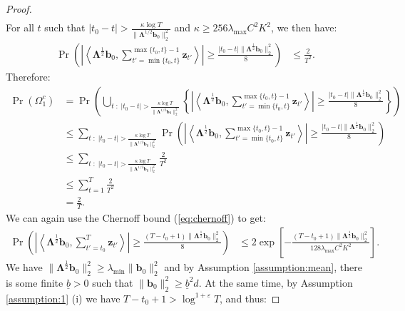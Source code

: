 \begin{proof}
\begin{align*}
\end{align*}
For all $t$ such that $|t_0 - t| > \frac{\kappa \log T}{\lVert \boldsymbol{\Lambda}^{1/2}\mathbf{b}_0\rVert_2^2}$ and $\kappa \geq 256\lambda_{\max}C^2K^2$, we then have: 
\begin{align*}
    \Pr\left(\left|\left\langle\boldsymbol{\Lambda}^{\frac{1}{2}}\mathbf{b}_0, \sum_{t'=\min\{t_0,t\}}^{\max\{t_0,t\}-1}\mathbf{z}_{t'} \right\rangle\right| \geq \frac{|t_0-t| \lVert\boldsymbol{\Lambda}^{\frac{1}{2}} \mathbf{b}_0\rVert_2^2}{8}\right) &\leq \frac{2}{T^2}.
\end{align*}
Therefore:
\begin{align*}
    \Pr(\Omega^c_1) &= \Pr\left(\bigcup_{t \;:\; |t_0 - t| > \frac{\kappa \log T}{\lVert \boldsymbol{\Lambda}^{1/2}\mathbf{b}_0\rVert_2^2}} \left\{\left|\left\langle\boldsymbol{\Lambda}^{\frac{1}{2}}\mathbf{b}_0, \sum_{t'=\min\{t_0,t\}}^{\max\{t_0,t\}-1}\mathbf{z}_{t'} \right\rangle\right| \geq \frac{|t_0-t| \lVert\boldsymbol{\Lambda}^{\frac{1}{2}} \mathbf{b}_0\rVert_2^2}{8}\right\} \right) \\
    &\leq \sum_{t \;:\; |t_0 - t| > \frac{\kappa \log T}{\lVert \boldsymbol{\Lambda}^{1/2}\mathbf{b}_0\rVert_2^2}}\Pr\left(\left|\left\langle\boldsymbol{\Lambda}^{\frac{1}{2}}\mathbf{b}_0, \sum_{t'=\min\{t_0,t\}}^{\max\{t_0,t\}-1}\mathbf{z}_{t'} \right\rangle\right| \geq \frac{|t_0-t| \lVert\boldsymbol{\Lambda}^{\frac{1}{2}} \mathbf{b}_0\rVert_2^2}{8}\right)\tag{union bound} \\
    &\leq \sum_{t \;:\; |t_0 - t| > \frac{\kappa \log T}{\lVert \boldsymbol{\Lambda}^{1/2}\mathbf{b}_0\rVert_2^2}} \frac{2}{T^2} \\
    &\leq \sum_{t=1}^T \frac{2}{T^2} \\
    &= \frac{2}{T}.
\end{align*}
We can again use the Chernoff bound (\ref{eq:chernoff}) to get: 
\begin{align*}
    \Pr\left(\left|\left\langle\boldsymbol{\Lambda}^{\frac{1}{2}}\mathbf{b}_0, \sum_{t'=t_0}^T \mathbf{z}_{t'} \right\rangle\right| \geq \frac{(T-t_0+1) \lVert\boldsymbol{\Lambda}^{\frac{1}{2}} \mathbf{b}_0\rVert_2^2}{8}\right) &\leq 2\exp\left[-\frac{(T-t_0+1)\lVert\boldsymbol{\Lambda}^{\frac{1}{2}} \mathbf{b}_0\rVert^2_2}{128\lambda_{\max}C^2K^2}\right].
\end{align*}
We have $\lVert\boldsymbol{\Lambda}^{\frac{1}{2}} \mathbf{b}_0\rVert^2_2 \geq \lambda_{\min} \lVert \mathbf{b}_0\rVert^2_2$ and by Assumption \ref{assumption:mean}, there is some finite $\underline{b} > 0$ such that $\lVert\mathbf{b}_0\rVert_2^2 \geq \underline{b}^2 d$. At the same time, by Assumption \ref{assumption:1} (i) we have $T-t_0 +1 > \log^{1+\varepsilon} T$, and thus:

\end{proof}

